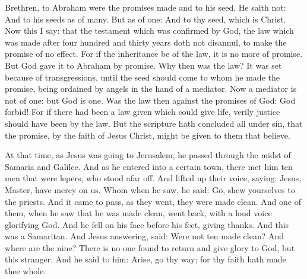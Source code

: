 Brethren, to Abraham were the promises made and to his seed. He saith not:
And to his seeds as of many. But as of one: And to thy seed, which is
Christ.
Now this I say: that the testament which was confirmed by God, the
law which was made after four hundred and thirty years doth not
disannul, to make the promise of no effect.
For if the inheritance be of the law, it is no more of promise.
But God gave it to Abraham by promise.
Why then was the law? It was set because of transgressions, until
the seed should come to whom he made the promise, being ordained by
angels in the hand of a mediator.
Now a mediator is not of one: but God is one.
Was the law then against the promises of God: God forbid!  For if
there had been a law given which could give life, verily justice should
have been by the law.
But the scripture hath concluded all under sin, that the promise,
by the faith of Jesus Christ, might be given to them that believe.



At that time, as Jesus was going to Jerusalem, he passed
through the midst of Samaria and Galilee.
And as he entered into a certain town, there met him ten men that
were lepers, who stood afar off.
And lifted up their voice, saying: Jesus, Master, have mercy on
us.
Whom when he saw, he said: Go, shew yourselves to the priests.
And it came to pass, as they went, they were made clean.
And one of them, when he saw that he was made clean, went back,
with a loud voice glorifying God.
And he fell on his face before his feet, giving thanks.  And this
was a Samaritan.
And Jesus answering, said: Were not ten made clean? And where are
the nine?
There is no one found to return and give glory to God, but this
stranger.
And he said to him: Arise, go thy way; for thy faith hath made
thee whole.





